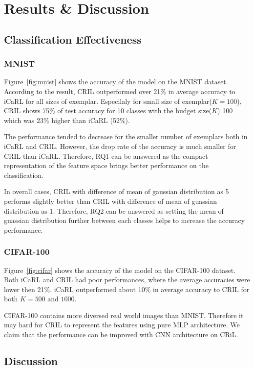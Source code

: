 \section{Results \& Discussion}
\label{sec:results}

\subsection{Classification Effectiveness}
\label{sec:results_effect}

\subsubsection{MNIST}
\label{sec:results_mnist}



Figure~\ref{fig:mnist} shows the accuracy of the model on the MNIST dataset. According to the result, CRIL outperformed over 21\% in average accuracy to iCaRL for all sizes of exemplar. 
Especilaly for small size of exemplar($K=100$), CRIL shows 75\% of test accuracy for 10 classes with the budget size($K$) 100 which was 23\% higher than iCaRL (52\%).

The performance tended to decrease for the smaller number of exemplars both in iCaRL and CRIL. However, the drop rate of the accuracy is much smaller for CRIL than iCaRL. Therefore, RQ1 can be answered as the compact representation of the feature space brings better performance on the classification.

In overall cases, CRIL with difference of mean of gaussian distribution as 5 performs slightly better than CRIL with difference of mean of guassian distribution as 1. Therefore, RQ2 can be answered as setting the mean of guassian distribution further between each classes helps to increase the accuracy performance.

\subsubsection{CIFAR-100}
\label{sec:results_cifar}


Figure~\ref{fig:cifar} shows the accuracy of the model on the CIFAR-100 dataset. Both iCaRL and CRIL had poor performances, where the average accuracies were lower then 21\%. iCaRL outperformed about 10\% in average accuracy to CRIL for both $K=500\textrm{ and }1000$.

CIFAR-100 contains more diversed real world images than MNIST. Therefore it may hard for CRIL to represent the features using pure MLP architecture. We claim that the performance can be improved with CNN architecture on CRiL.

\subsection{Discussion}

